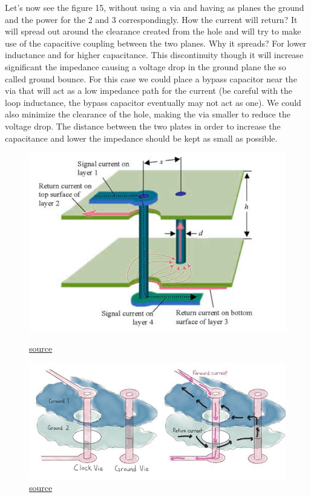 \documentclass[12pt]{article}
\begin{document}
Let's now see the figure 15, without using a via and having as planes the ground and the power for the 2 and 3 correspondingly. How the current will return? It will spread out around the clearance created from the hole and will try to make use of the capacitive coupling between the two planes. Why it spreads? For lower inductance and for higher capacitance. This discontinuity though it will increase significant the impedance causing a voltage drop in the ground plane the so called ground bounce. For this case we could place a bypass capacitor near the via that will act as a low impedance path for the current (be careful with the loop inductance, the bypass capacitor eventually may not act as one). We could also minimize the clearance of the hole, making the via smaller to reduce the voltage drop. The distance between the two plates in order to increase the capacitance and lower the impedance should be kept as small as possible.

\begin{figure}[h!]
	\centering
	\begin{minipage}[b]{0.4\textwidth}
		\includegraphics[keepaspectratio, width=\textwidth]{assets/change_layer.png}
		\caption{\href{http://www.sigcon.com/Pubs/news/6_04.htm}{source}}
	\end{minipage}
	\hfill
	\begin{minipage}[b]{0.4\textwidth}
		\includegraphics[width=\textwidth, keepaspectratio]{assets/ground_trans.png}
		\caption{\href{https://www.tempoautomation.com/blog/design-to-avoid-emi-problems-keep-clocks-away-from-unintended-antennas/}{source}}
	\end{minipage}
\end{figure}
\end{document}
